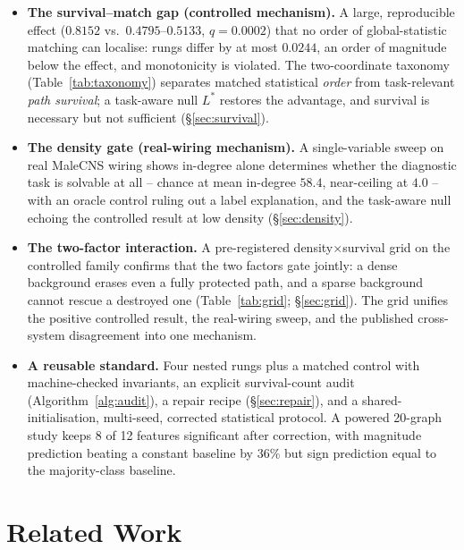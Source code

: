 \documentclass[10pt,twocolumn,letterpaper]{article}
\begin{document}
\begin{itemize}
\item \textbf{The survival--match gap (controlled mechanism).} A large,
  reproducible effect ($0.8152$ vs.\ $0.4795$--$0.5133$, $q=0.0002$) that no
  order of global-statistic matching can localise: rungs differ by at most
  $0.0244$, an order of magnitude below the effect, and monotonicity is
  violated. The two-coordinate taxonomy (Table~\ref{tab:taxonomy}) separates
  matched statistical \emph{order} from task-relevant \emph{path survival};
  a task-aware null $L^*$ restores the advantage, and survival is necessary
  but not sufficient (\S\ref{sec:survival}).
\item \textbf{The density gate (real-wiring mechanism).} A single-variable
  sweep on real MaleCNS wiring shows in-degree alone determines whether the
  diagnostic task is solvable at all -- chance at mean in-degree $58.4$,
  near-ceiling at $4.0$ -- with an oracle control ruling out a label
  explanation, and the task-aware null echoing the controlled result at low
  density (\S\ref{sec:density}).
\item \textbf{The two-factor interaction.} A pre-registered
  density$\times$survival grid on the controlled family confirms that the two
  factors gate jointly: a dense background erases even a fully protected
  path, and a sparse background cannot rescue a destroyed one
  (Table~\ref{tab:grid}; \S\ref{sec:grid}). The grid unifies the positive
  controlled result, the real-wiring sweep, and the published cross-system
  disagreement into one mechanism.
\item \textbf{A reusable standard.} Four nested rungs plus a matched control
  with machine-checked invariants, an explicit survival-count audit
  (Algorithm~\ref{alg:audit}), a repair recipe (\S\ref{sec:repair}), and a
  shared-initialisation, multi-seed, corrected statistical protocol. A powered
  20-graph study keeps 8 of 12 features significant after correction, with
  magnitude prediction beating a constant baseline by 36\% but sign prediction
  equal to the majority-class baseline.
\end{itemize}

\section{Related Work}
\label{sec:related}
\end{document}
